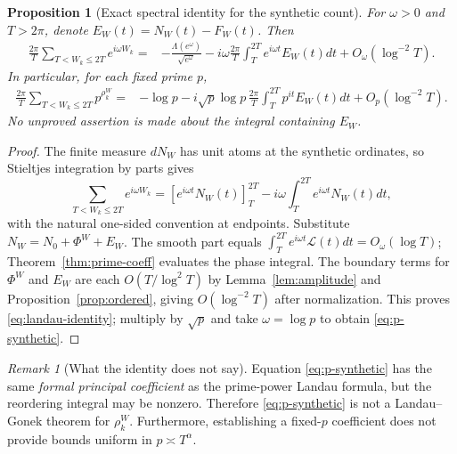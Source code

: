 \documentclass[11pt,leqno]{amsart}
\numberwithin{equation}{section}
\newtheorem{proposition}[theorem]{Proposition}
\theoremstyle{definition}
\theoremstyle{remark}
\newtheorem{remark}[theorem]{Remark}
\newcommand{\1}{\mathbf 1}
\begin{document}
\begin{proposition}[Exact spectral identity for the synthetic count]\label{prop:synthetic-spectrum}
For $\omega>0$ and $T>2\pi$, denote $E_W(t)=N_W(t)-F_W(t)$. Then
\begin{equation}\label{eq:landau-identity}
 \boxed{\begin{aligned}
 \frac{2\pi}{T}\sum_{T<W_k\le2T}e^{i\omega W_k}
 ={}&-\frac{\Lambda(e^\omega)}{\sqrt{e^\omega}}
 -i\omega\frac{2\pi}{T}\int_T^{2T}e^{i\omega t}E_W(t)dt
 +O_\omega(\log^{-2}T).
 \end{aligned}}
\end{equation}
In particular, for each fixed prime $p$,
\begin{equation}\label{eq:p-synthetic}
 \boxed{\begin{aligned}
 \frac{2\pi}{T}\sum_{T<W_k\le2T}p^{\rho_k^W}
 ={}&-\log p
 -i\sqrt p\log p\,\frac{2\pi}{T}\int_T^{2T}p^{it}E_W(t)dt
 +O_p(\log^{-2}T).
 \end{aligned}}
\end{equation}
No unproved assertion is made about the integral containing $E_W$.
\end{proposition}
\begin{proof}
The finite measure $dN_W$ has unit atoms at the synthetic ordinates, so Stieltjes integration by parts gives
\begin{equation}\label{eq:stieltjes-count}
 \sum_{T<W_k\le2T}e^{i\omega W_k}
 =[e^{i\omega t}N_W(t)]_T^{2T}-i\omega\int_T^{2T}e^{i\omega t}N_W(t)dt,
\end{equation}
with the natural one-sided convention at endpoints. Substitute $N_W=N_0+\Phi^W+E_W$. The smooth part equals $\int_T^{2T}e^{i\omega t}\mathcal L(t)dt=O_\omega(\log T)$; Theorem~\ref{thm:prime-coeff} evaluates the phase integral. The boundary terms for $\Phi^W$ and $E_W$ are each $O(T/\log^2T)$ by Lemma~\ref{lem:amplitude} and Proposition~\ref{prop:ordered}, giving $O(\log^{-2}T)$ after normalization. This proves \eqref{eq:landau-identity}; multiply by $\sqrt p$ and take $\omega=\log p$ to obtain \eqref{eq:p-synthetic}.
\end{proof}
\begin{remark}[What the identity does not say]
Equation \eqref{eq:p-synthetic} has the same \emph{formal principal coefficient} as the prime-power Landau formula, but the reordering integral may be nonzero. Therefore \eqref{eq:p-synthetic} is not a Landau--Gonek theorem for $\rho_k^W$. Furthermore, establishing a fixed-$p$ coefficient does not provide bounds uniform in $p\asymp T^\alpha$.
\end{remark}
\end{document}
